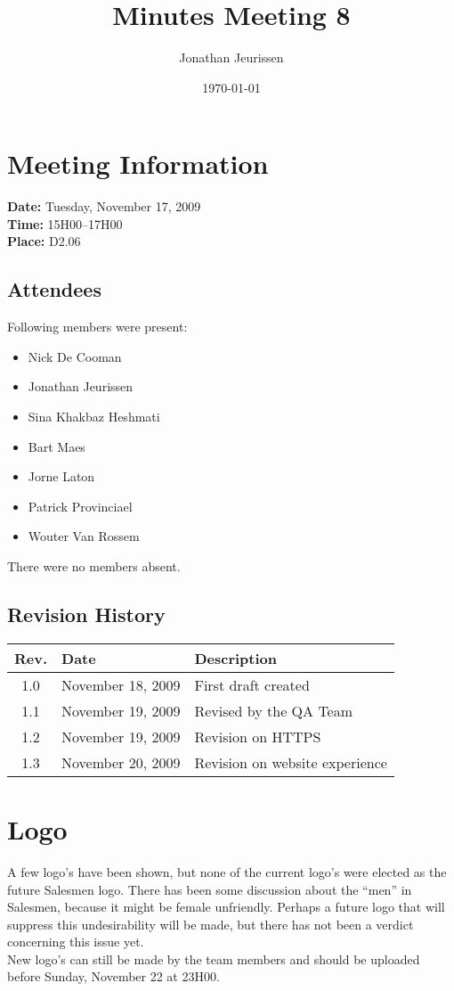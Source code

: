\documentclass[a4paper, 12pt]{article}
\begin{document}
\title{Minutes Meeting 8}
\author{Jonathan Jeurissen}
\date{\today}

\maketitle	
	\section{Meeting Information}
		\textbf{Date:} Tuesday, November 17, 2009\\
		\textbf{Time:} 15H00--17H00\\
		\textbf{Place:} D2.06\\
		\subsection{Attendees}
Following members were present:
			\begin{itemize}
				\item Nick De Cooman
				\item Jonathan Jeurissen
				\item Sina Khakbaz Heshmati
				\item Bart Maes
				\item Jorne Laton
				\item Patrick Provinciael
				\item Wouter Van Rossem
			\end{itemize}
There were no members absent.
			
		\subsection{Revision History}
			\begin{tabular}{c | l | l }
				\textbf{Rev.} & \textbf{Date} & \textbf{Description} \\
				\hline
				1.0 & November 18, 2009 & First draft created \\
				1.1 & November 19, 2009 & Revised by the QA Team \\
				1.2 & November 19, 2009 & Revision on HTTPS \\
				1.3 & November 20, 2009 & Revision on website experience \\
			\end{tabular}		

	\section{Logo}
A few logo's have been shown, but none of the current logo's were elected as the future Salesmen logo. There has been some discussion about the ``men'' in Salesmen, because it might be female unfriendly. Perhaps a future logo that will suppress this undesirability will be made, but there has not been a verdict concerning this issue yet. \\
New logo's can still be made by the team members and should be uploaded before Sunday, November 22 at 23H00.
\end{document}
